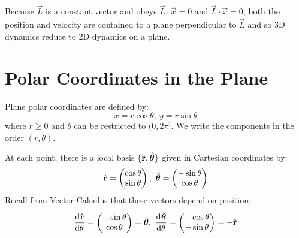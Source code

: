 \documentclass[../main.tex]{subfiles}
\begin{document}
Because $\vec{L}$ is a constant vector and obeys $\vec{L} \cdot \vec{x} = 0$ and $\vec{L} \cdot \dot{\vec{x}} = 0$, both the position and velocity are contained to a plane perpendicular to $\vec{L}$ and so 3D dynamics reduce to 2D dynamics on a plane.
\section{Polar Coordinates in the Plane} \label{polarCoordinates}
\begin{definition}
  Plane polar coordinates are defined by:
  \[
    x = r \cos \theta,\ y = r \sin \theta
  \]
  where $r \geq 0$ and $\theta$ can be restricted to $(0, 2\pi]$.
  We write the components in the order $(r, \theta)$.
\end{definition}
\begin{center}
\end{center}
At each point, there is a local basis $\{\hat{\mathbf{\bm{r}}}, \hat{\mathbf{\bm{\theta}}}\}$ given in Cartesian coordinates by:
\[
  \hat{\mathbf{\bm{r}}} = \begin{pmatrix}
  \cos \theta \\
  \sin \theta \\
  \end{pmatrix},\
  \hat{\mathbf{\bm{\theta}}} = \begin{pmatrix}
  -\sin \theta \\
  \cos \theta \\
  \end{pmatrix}
\]
Recall from Vector Calculus that these vectors depend on position:
\[
  \deriv{\uvec{r}}{\theta} = \begin{pmatrix}
  -\sin \theta \\
  \cos \theta \\
  \end{pmatrix} = \uvec{\theta},\
  \deriv{\uvec{\theta}}{\theta} = \begin{pmatrix}
  -\cos \theta \\
  -\sin \theta \\
  \end{pmatrix}= -\uvec{r}
\]
\end{document}
